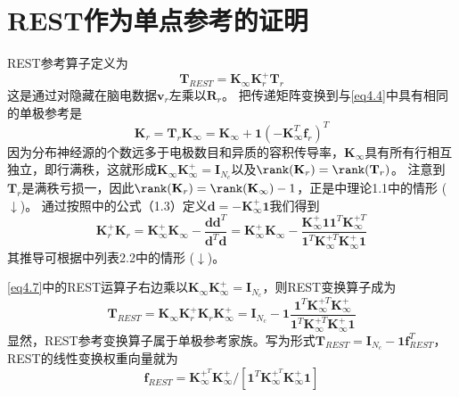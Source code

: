 \section{REST作为单点参考的证明}\label{RESTasUR}
REST参考算子定义为
\begin{equation}\label{eq4.7}
\mathbf{T}_{REST}=\mathbf{K}_{\infty}\mathbf{K}_r^+\mathbf{T}_r
\end{equation}
这是通过对隐藏在脑电数据$\mathbf{v}_r$左乘以$\mathbf{R}_r$。 把传递矩阵变换到与\eqref{eq4.4}中具有相同的单极参考是
\begin{equation}\label{eq4.8}
\mathbf{K}_{r}=\mathbf{T}_r\mathbf{K}_{\infty}=\mathbf{K}_{\infty}+\mathbf{1}(\mathbf{-K}_{\infty}^T\mathbf{f}_r)^T
\end{equation}
因为分布神经源的个数远多于电极数目和异质的容积传导率，$\mathbf{K}_{\infty}$具有所有行相互独立，即行满秩，这就形成$\mathbf{K}_{\infty}\mathbf{K}_{\infty}^+=\mathbf{I}_{N_c}$以及$\rank(\mathbf{K}_r)=\rank(\mathbf{T}_r)$。 注意到$\mathbf{T}_r$是满秩亏损一，因此$\rank(\mathbf{K}_r)=\rank(\mathbf{K}_{\infty})-1$，正是\cite{baksalary_revisitation_2003}中理论1.1中的情形 ($\downarrow$)。 
通过按照\cite{baksalary_revisitation_2003}中的公式（1.3）定义$\mathbf{d}=-\mathbf{K}_{\infty}^+\mathbf{1}$我们得到
\begin{equation}\label{eq4.9}
\mathbf{K}_{r}^+\mathbf{K}_{r}=\mathbf{K}_{\infty}^+\mathbf{K}_{\infty}-\frac{\mathbf{dd}^T}{{\mathbf{d}^T\mathbf{d}}}=\mathbf{K}_{\infty}^+\mathbf{K}_{\infty}-\frac{\mathbf{K}_{\infty}^+\mathbf{11}^T\mathbf{K}_{\infty}^{+T}}{{\mathbf{1}^T\mathbf{K}_{\infty}^{+T}\mathbf{K}_{\infty}^+\mathbf{1}}}
\end{equation}
其推导可根据\cite{baksalary_revisitation_2003}中列表2.2中的情形 ($\downarrow$)。

\eqref{eq4.7}中的REST运算子右边乘以$\mathbf{K}_{\infty}\mathbf{K}_{\infty}^+=\mathbf{I}_{N_c}$，则REST变换算子成为
\begin{equation}\label{eq4.10}
\mathbf{T}_{REST}=\mathbf{K}_{\infty}\mathbf{K}_{r}^+\mathbf{K}_{r}\mathbf{K}_{\infty}^+=\mathbf{I}_{N_c}-\mathbf{1}\frac{\mathbf{1}^T\mathbf{K}_{\infty}^{+T}\mathbf{K}_{\infty}^+}{\mathbf{1}^T\mathbf{K}_{\infty}^{+T}\mathbf{K}_{\infty}^+\mathbf{1}}
\end{equation}
显然，REST参考变换算子属于单极参考家族。写为形式$\mathbf{T}_{REST}=\mathbf{I}_{N_c}-\mathbf{1}\mathbf{f}_{REST}^T$，REST的线性变换权重向量就为
\begin{equation}\label{eq4.11}
\mathbf{f}_{REST}=\mathbf{K}_{\infty}^{+^T}\mathbf{K}_{\infty}^+/{[\mathbf{1}^T\mathbf{K}_{\infty}^{+^T}\mathbf{K}_{\infty}^+\mathbf{1}]}
\end{equation}

